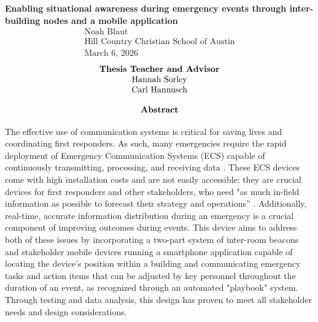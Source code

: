 \documentclass[english,12pt,a4paper,titlepage]{article}
\begin{document}
	\thispagestyle{empty}
	\label{Title Page}
	\begin{center}
		{\large\textbf{Enabling situational awareness during emergency events through inter-building nodes and a mobile application}}\\
		\[
		\begin{array}{cc}
			\mbox{Noah Blaut}\\
			\mbox{Hill Country Christian School of Austin}\\
			\mbox{March 6, 2026}
		\end{array}
		\]
		\vspace{1in}
		\[
		\begin{array}{cc}
			\mbox{\textbf{Thesis Teacher and Advisor}}\\
			\mbox{Hannah Sorley}\\
			\mbox{Carl Hannusch}
		\end{array}
		\]
	\end{center}
	
	\setcounter{page}{0}
	
	\newpage
	\pagestyle{headerstyle}
	\[
	\begin{array}{cc}
		\mbox{\bfseries{Abstract}}
		\label{Abstract}
	\end{array}
	\]
	
	The effective use of communication systems is critical for saving lives and coordinating first responders. As such, many emergencies require the rapid deployment of Emergency Communication Systems (ECS) capable of continuously transmitting, processing, and receiving data \autocite{Navarro}. These ECS devices come with high installation costs and are not easily accessible; they are crucial devices for first responders and other stakeholders, who need "as much in-field information as possible to forecast their strategy and operations” \autocite{Navarro}. Additionally, real-time, accurate information distribution during an emergency is a crucial component of improving outcomes during events. This device aims to address both of these issues by incorporating a two-part system of inter-room beacons and stakeholder mobile devices running a smartphone application capable of locating the device's position within a building and communicating emergency tasks and action items that can be adjusted by key personnel throughout the duration of an event, as recognized through an automated "playbook" system. Through testing and data analysis, this design has proven to meet all stakeholder needs and design considerations.
	
\end{document}
